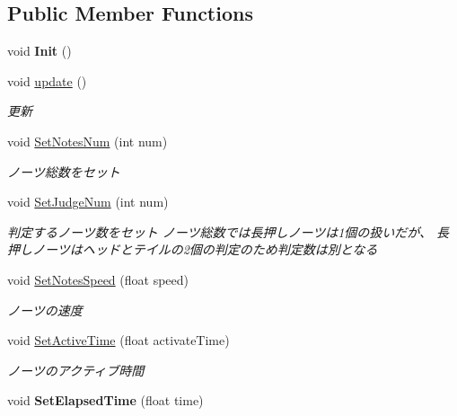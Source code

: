 \subsection*{Public Member Functions}
\begin{DoxyCompactItemize}
\item 
void {\bfseries Init} ()\hypertarget{class_notes_manager_a5c7e5c0033598dd87f078fb24397a0bc}{}\label{class_notes_manager_a5c7e5c0033598dd87f078fb24397a0bc}

\item 
void \hyperlink{class_notes_manager_a6f4913237b8e3a4e68f5172f71e51590}{update} ()
\begin{DoxyCompactList}\small\item\em 更新 \end{DoxyCompactList}\item 
void \hyperlink{class_notes_manager_afeb4ec920546b7cc061c50bf2c378f05}{Set\+Notes\+Num} (int num)
\begin{DoxyCompactList}\small\item\em ノーツ総数をセット \end{DoxyCompactList}\item 
void \hyperlink{class_notes_manager_a7be6fd1ad14c143595d4d566cba15442}{Set\+Judge\+Num} (int num)
\begin{DoxyCompactList}\small\item\em 判定するノーツ数をセット ノーツ総数では長押しノーツは1個の扱いだが、 長押しノーツはヘッドとテイルの2個の判定のため判定数は別となる \end{DoxyCompactList}\item 
void \hyperlink{class_notes_manager_a5f5c4538a0d5e8e7cbd9951dddb718d5}{Set\+Notes\+Speed} (float speed)
\begin{DoxyCompactList}\small\item\em ノーツの速度 \end{DoxyCompactList}\item 
void \hyperlink{class_notes_manager_a525cac5533517b75264f0b01b86373d1}{Set\+Active\+Time} (float activate\+Time)
\begin{DoxyCompactList}\small\item\em ノーツのアクティブ時間 \end{DoxyCompactList}\item 
void {\bfseries Set\+Elapsed\+Time} (float time)\hypertarget{class_notes_manager_af3b3d718a9bb6dea98b77836bce7ae99}{}\label{class_notes_manager_af3b3d718a9bb6dea98b77836bce7ae99}


\end{DoxyCompactItemize}
